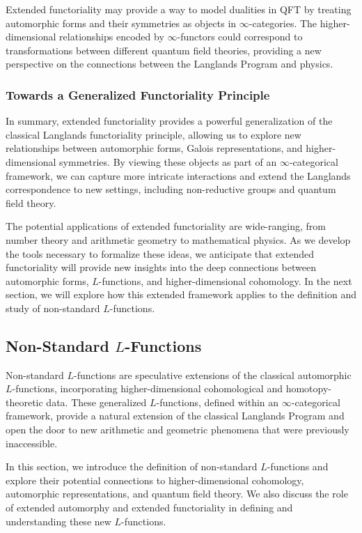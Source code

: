 \documentclass{article}
\theoremstyle{remark}
\begin{document}
Extended functoriality may provide a way to model dualities in QFT by treating automorphic forms and their symmetries as objects in $\infty$-categories. The higher-dimensional relationships encoded by $\infty$-functors could correspond to transformations between different quantum field theories, providing a new perspective on the connections between the Langlands Program and physics.

\subsubsection{Towards a Generalized Functoriality Principle}

In summary, extended functoriality provides a powerful generalization of the classical Langlands functoriality principle, allowing us to explore new relationships between automorphic forms, Galois representations, and higher-dimensional symmetries. By viewing these objects as part of an $\infty$-categorical framework, we can capture more intricate interactions and extend the Langlands correspondence to new settings, including non-reductive groups and quantum field theory.

The potential applications of extended functoriality are wide-ranging, from number theory and arithmetic geometry to mathematical physics. As we develop the tools necessary to formalize these ideas, we anticipate that extended functoriality will provide new insights into the deep connections between automorphic forms, $L$-functions, and higher-dimensional cohomology. In the next section, we will explore how this extended framework applies to the definition and study of non-standard $L$-functions.

\subsection{Non-Standard $L$-Functions}

Non-standard $L$-functions are speculative extensions of the classical automorphic $L$-functions, incorporating higher-dimensional cohomological and homotopy-theoretic data. These generalized $L$-functions, defined within an $\infty$-categorical framework, provide a natural extension of the classical Langlands Program and open the door to new arithmetic and geometric phenomena that were previously inaccessible.

In this section, we introduce the definition of non-standard $L$-functions and explore their potential connections to higher-dimensional cohomology, automorphic representations, and quantum field theory. We also discuss the role of extended automorphy and extended functoriality in defining and understanding these new $L$-functions.
\end{document}
